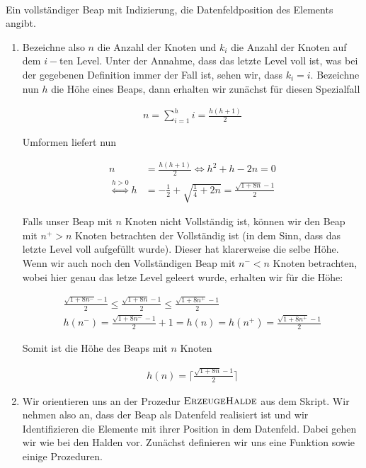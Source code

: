 \begin{solution}
\phantom{}
\begin{center}
   \\
  Ein vollständiger Beap mit Indizierung, die Datenfeldposition des Elements angibt.
\end{center}



\begin{enumerate}[label = \alph*)]
  \item Bezeichne also $n$ die Anzahl der Knoten und $k_i$ die Anzahl der Knoten auf dem $i-$ten Level. Unter der Annahme, dass das letzte Level voll ist, was bei der gegebenen Definition immer der Fall ist, sehen wir, dass $k_i = i$. Bezeichne nun $h$ die Höhe eines Beaps, dann erhalten wir zunächst für diesen Spezialfall

  \begin{align*}
    n
    =
    \sum_{i=1}^h i
    =
    \frac{h(h+1)}{2}
  \end{align*}

  Umformen liefert nun

  \begin{align*}
    n
    &=
    \frac{h(h+1)}{2}
    \iff
    h^2 + h - 2n = 0 \\
    \stackrel{h > 0}{\iff}
    h &= -\frac{1}{2} + \sqrt{\frac{1}{4} + 2n}
    = \frac{\sqrt{1 + 8n} - 1}{2}
  \end{align*}

Falls unser Beap mit $n$ Knoten nicht Vollständig ist, können wir den Beap mit $n^+ > n$ Knoten betrachten der Vollständig ist (in dem Sinn, dass das letzte Level voll aufgefüllt wurde). Dieser hat klarerweise die selbe Höhe. Wenn wir auch noch den Vollständigen Beap mit $n^- < n$ Knoten betrachten, wobei hier genau das letze Level geleert wurde, erhalten wir für die Höhe:

\begin{align*}
 \frac{\sqrt{1 + 8n^-} - 1}{2}
 \leq
 \frac{\sqrt{1 + 8n} - 1}{2}
 \leq
 \frac{\sqrt{1 + 8n^+} - 1}{2} \\
  h(n^-) = \frac{\sqrt{1 + 8n^-} - 1}{2} + 1
  =
  h(n)
  =
  h(n^+) = \frac{\sqrt{1 + 8n^+} - 1}{2}
\end{align*}

Somit ist die Höhe des Beaps mit $n$ Knoten

\begin{align*}
  h(n)
  =
  \Big\lceil \frac{\sqrt{1 + 8n} - 1}{2}\Big\rceil
\end{align*}
  \item Wir orientieren uns an der Prozedur $\textsc{ErzeugeHalde}$ aus dem Skript. Wir nehmen also an, dass der Beap als Datenfeld realisiert ist und wir Identifizieren die Elemente mit ihrer Position in dem Datenfeld. Dabei gehen wir wie bei den Halden vor. Zunächst definieren wir uns eine Funktion sowie einige Prozeduren.


\end{enumerate}
\end{solution}
